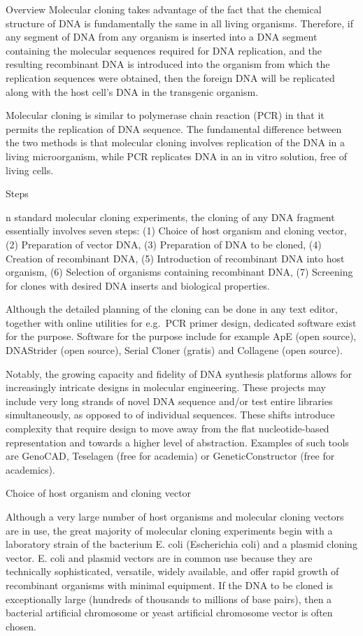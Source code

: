 Overview
Molecular cloning takes advantage of the fact that the chemical structure of DNA is fundamentally the same in all living organisms. Therefore, if any segment of DNA from any organism is inserted into a DNA segment containing the molecular sequences required for DNA replication, and the resulting recombinant DNA is introduced into the organism from which the replication sequences were obtained, then the foreign DNA will be replicated along with the host cell's DNA in the transgenic organism.

Molecular cloning is similar to polymerase chain reaction (PCR) in that it permits the replication of DNA sequence. The fundamental difference between the two methods is that molecular cloning involves replication of the DNA in a living microorganism, while PCR replicates DNA in an in vitro solution, free of living cells.

Steps

n standard molecular cloning experiments, the cloning of any DNA fragment essentially involves seven steps: (1) Choice of host organism and cloning vector, (2) Preparation of vector DNA, (3) Preparation of DNA to be cloned, (4) Creation of recombinant DNA, (5) Introduction of recombinant DNA into host organism, (6) Selection of organisms containing recombinant DNA, (7) Screening for clones with desired DNA inserts and biological properties.

Although the detailed planning of the cloning can be done in any text editor, together with online utilities for e.g.~PCR primer design, dedicated software exist for the purpose. Software for the purpose include for example ApE (open source), DNAStrider (open source), Serial Cloner (gratis) and Collagene (open source).

Notably, the growing capacity and fidelity of DNA synthesis platforms allows for increasingly intricate designs in molecular engineering. These projects may include very long strands of novel DNA sequence and/or test entire libraries simultaneously, as opposed to of individual sequences. These shifts introduce complexity that require design to move away from the flat nucleotide-based representation and towards a higher level of abstraction. Examples of such tools are GenoCAD, Teselagen (free for academia) or GeneticConstructor (free for academics).

Choice of host organism and cloning vector

Although a very large number of host organisms and molecular cloning vectors are in use, the great majority of molecular cloning experiments begin with a laboratory strain of the bacterium E. coli (Escherichia coli) and a plasmid cloning vector. E. coli and plasmid vectors are in common use because they are technically sophisticated, versatile, widely available, and offer rapid growth of recombinant organisms with minimal equipment. If the DNA to be cloned is exceptionally large (hundreds of thousands to millions of base pairs), then a bacterial artificial chromosome or yeast artificial chromosome vector is often chosen.

